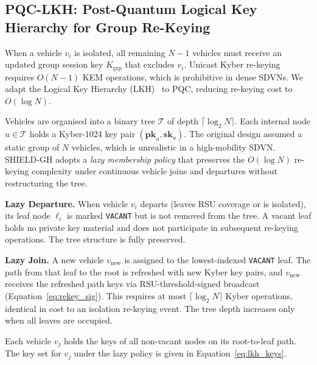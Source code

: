\documentclass[12pt, a4paper]{report}
\begin{document}

\subsection{PQC-LKH: Post-Quantum Logical Key Hierarchy for Group Re-Keying}
\label{sec:pqc_lkh}

When a vehicle $v_i$ is isolated, all remaining $N-1$ vehicles must
receive an updated group session key $K_{\text{grp}}$ that excludes
$v_i$. Unicast Kyber re-keying requires $O(N-1)$ KEM operations,
which is prohibitive in dense SDVNs. We adapt the Logical Key
Hierarchy (LKH)~\cite{wallner1999lkh} to PQC, reducing re-keying
cost to $O(\log N)$.

Vehicles are organised into a binary tree $\mathcal{T}$ of depth
$\lceil \log_2 N \rceil$. Each internal node $u \in \mathcal{T}$
holds a Kyber-1024 key pair $(\mathbf{pk}_u, \mathbf{sk}_u)$. The
original design assumed a static group of $N$ vehicles, which is
unrealistic in a high-mobility SDVN. SHIELD-GH adopts a
\emph{lazy membership policy} that preserves the $O(\log N)$
re-keying complexity under continuous vehicle joins and departures
without restructuring the tree.

\textbf{Lazy Departure.}
When vehicle $v_i$ departs (leaves RSU coverage or is isolated),
its leaf node $\ell_i$ is marked \texttt{VACANT} but is not
removed from the tree. A vacant leaf holds no private key
material and does not participate in subsequent re-keying
operations. The tree structure is fully preserved.

\textbf{Lazy Join.}
A new vehicle $v_{\text{new}}$ is assigned to the
lowest-indexed \texttt{VACANT} leaf. The path from that leaf
to the root is refreshed with new Kyber key pairs, and
$v_{\text{new}}$ receives the refreshed path keys via
RSU-threshold-signed broadcast (Equation~\eqref{eq:rekey_sig}).
This requires at most $\lceil \log_2 N \rceil$ Kyber operations,
identical in cost to an isolation re-keying event. The tree depth
increases only when all leaves are occupied.

Each vehicle $v_j$ holds the keys of all non-vacant nodes on its
root-to-leaf path. The key set for $v_j$ under the lazy policy is
given in Equation~\eqref{eq:lkh_keys}.
\end{document}
